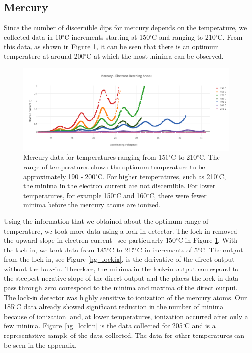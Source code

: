 \documentclass[prb,preprint]{revtex4-1}
\begin{document}
\subsection{Mercury}

Since the number of discernible dips for mercury depends on the temperature, we collected data in 10$^{\circ}$C increments starting at 150$^{\circ}$C and ranging to 210$^{\circ}$C. From this data, as shown in Figure \ref{hg_data}, it can be seen that there is an optimum temperature at around 200$^{\circ}$C at which the most minima can be observed. 

\begin{figure}[h!]
\centering

\includegraphics[width=6in]{hg_data.pdf}
\caption{Mercury data for temperatures ranging from 150$^{\circ}$C to 210$^{\circ}$C. The range of temperatures shows the optimum temperature to be approximately 190 - 200$^{\circ}$C. For higher temperatures, such as 210$^{\circ}$C, the minima in the electron current are not discernible. For lower temperatures, for example 150$^{\circ}$C and 160$^{\circ}$C, there were fewer minima before the mercury atoms are ionized.}

\label{hg_data}
\end{figure}

Using the information that we obtained about the optimum range of temperature, we took more data using a lock-in detector. The lock-in removed the upward slope in electron current-- see particularly 150$^{\circ}$C in Figure \ref{hg_data}. With the lock-in, we took data from 185$^{\circ}$C to 215$^{\circ}$C in increments of 5$^{\circ}$C. The output from the lock-in, see Figure \ref{hg_lockin}, is the derivative of the direct output without the lock-in. Therefore, the minima in the lock-in output correspond to the steepest negative slope of the direct output and the places the lock-in data pass through zero correspond to the minima and maxima of the direct output. The lock-in detector was highly sensitive to ionization of the mercury atoms. Our 185$^{\circ}$C data already showed significant reduction in the number of minima because of ionization, and, at lower temperatures, ionization occurred after only a few minima. Figure \ref{hg_lockin} is the data collected for 205$^{\circ}$C and is a representative sample of the data collected. The data for other temperatures can be seen in the appendix.
\end{document}
